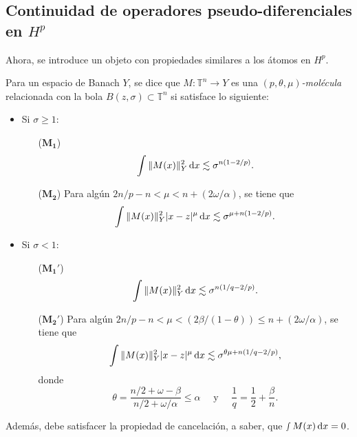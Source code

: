 \subsection{Continuidad de operadores pseudo-diferenciales en $H^p$}
Ahora, se introduce un objeto con propiedades similares a los átomos en $H^p$.
\begin{definition}[Molécula]\label{def:molecule}
	Para un espacio de Banach $Y$, se dice que $M:\mathbb{T}^n\rightarrow Y$ es una \textit{$(p, \theta, \mu)$-molécula} relacionada con la bola $B(z, \sigma) \subset \mathbb{T}^n$ si satisface lo siguiente:
	\begin{itemize}
		\item Si $\sigma \geq 1$:
		\begin{itemize}
			\item[($\mathbf{M_1}$)] \begin{equation*}
				\int \|M(x)\|_Y^2\mathop{}\!\mathrm{d} x \lesssim \sigma^{n(1-2/p)}.
			\end{equation*}
			\item[($\mathbf{M_2}$)] Para algún $2n/p-n < \mu < n + (2\omega/\alpha)$, se tiene que
			\begin{equation*}
				\int \|M(x)\|_Y^2|x-z|^\mu \mathop{}\!\mathrm{d} x \lesssim \sigma^{\mu + n(1-2/p)}.
			\end{equation*}
		\end{itemize}
		\item Si $\sigma < 1$:
		\begin{itemize}
			\item[($\mathbf{M_1'}$)] \begin{equation*}
				\int \|M(x)\|_Y^2\mathop{}\!\mathrm{d} x \lesssim \sigma^{n(1/q-2/p)}.
			\end{equation*}
			\item[($\mathbf{M_2'}$)] Para algún $2n/p-n < \mu < (2\beta/(1-\theta)) \leq n + (2\omega/\alpha)$, se tiene que
			\begin{equation*}
				\int \|M(x)\|_Y^2|x-z|^\mu \mathop{}\!\mathrm{d} x \lesssim \sigma^{\theta\mu + n(1/q-2/p)}, 
			\end{equation*}
			donde 
			\begin{equation*}
				\theta = \frac{n/2 + \omega - \beta}{n/2+\omega/\alpha}\leq \alpha \quad \text{ y } \quad \frac{1}{q} = \frac{1}{2} + \frac{\beta}{n}.
			\end{equation*}
		\end{itemize}
	\end{itemize}
	Además, debe satisfacer la propiedad de cancelación, a saber, que $\smallint M(x)\mathop{}\!\mathrm{d} x = 0$.
\end{definition}
